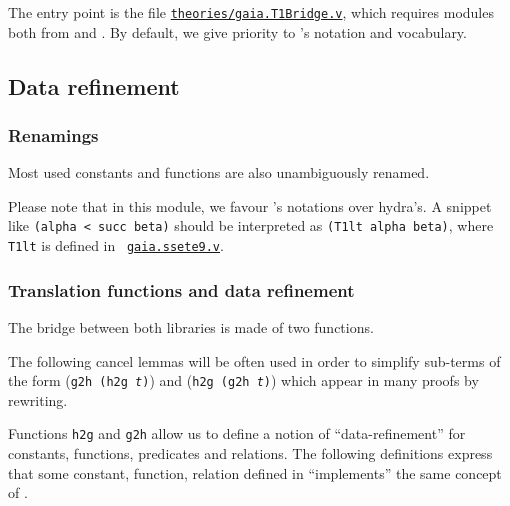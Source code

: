 The \gaiaHydras entry point is the file
\href{../theories/html/gaia_hydras.T1Bridge.html}%
{\texttt{theories/gaia.T1Bridge.v}}, which requires modules both from \HydrasLib and \gaia. By default, we give priority to \gaia's notation and vocabulary.






\subsection{Data refinement}

\subsubsection{Renamings}

Most used constants and functions are also unambiguously renamed.



Please note that in this module, we favour \gaia's notations over hydra's. A snippet like \texttt{(alpha < succ beta)} should be interpreted as \texttt{(T1lt alpha beta)}, where \texttt{T1lt} is defined in ~\href{https://github.com/coq-community/gaia/blob/master/theories/ssete9.v}{\texttt{gaia.ssete9.v}}.


\subsubsection{Translation functions and data refinement}

The bridge between both libraries is made of two functions.


The following cancel lemmas will be often used in order to simplify sub-terms of the form (\texttt{g2h (h2g {\it t})}) and (\texttt{h2g (g2h {\it t})}) which appear in many proofs by rewriting.





Functions \texttt{h2g} and \texttt{g2h} allow us to define
a notion of ``data-refinement''  for constants, functions, predicates and relations. The following definitions express that some
constant, function, relation defined in \HydrasLib ``implements'' the same concept of \gaia.


